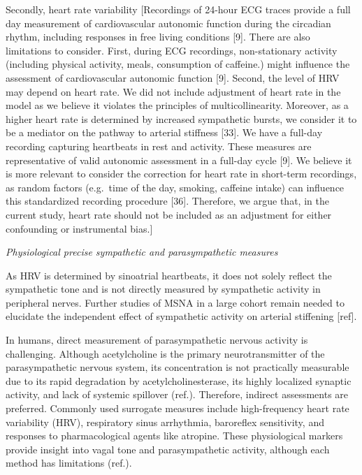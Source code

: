 \documentclass[
  a4paper,
  headsepline=true,
  open=any]{scrbook}
\begin{document}
Secondly, heart rate variability {[}Recordings of 24-hour ECG traces
provide a full day measurement of cardiovascular autonomic function
during the circadian rhythm, including responses in free living
conditions {[}9{]}. There are also limitations to consider. First,
during ECG recordings, non-stationary activity (including physical
activity, meals, consumption of caffeine.) might influence the
assessment of cardiovascular autonomic function {[}9{]}. Second, the
level of HRV may depend on heart rate. We did not include adjustment of
heart rate in the model as we believe it violates the principles of
multicollinearity. Moreover, as a higher heart rate is determined by
increased sympathetic bursts, we consider it to be a mediator on the
pathway to arterial stiffness {[}33{]}. We have a full-day recording
capturing heartbeats in rest and activity. These measures are
representative of valid autonomic assessment in a full-day cycle
{[}9{]}. We believe it is more relevant to consider the correction for
heart rate in short-term recordings, as random factors (e.g.~time of the
day, smoking, caffeine intake) can influence this standardized recording
procedure {[}36{]}. Therefore, we argue that, in the current study,
heart rate should not be included as an adjustment for either
confounding or instrumental bias.{]}

\emph{Physiological precise sympathetic and parasympathetic measures}

As HRV is determined by sinoatrial heartbeats, it does not solely
reflect the sympathetic tone and is not directly measured by sympathetic
activity in peripheral nerves. Further studies of MSNA in a large cohort
remain needed to elucidate the independent effect of sympathetic
activity on arterial stiffening {[}ref{]}.

In humans, direct measurement of parasympathetic nervous activity is
challenging. Although acetylcholine is the primary neurotransmitter of
the parasympathetic nervous system, its concentration is not practically
measurable due to its rapid degradation by acetylcholinesterase, its
highly localized synaptic activity, and lack of systemic spillover
(ref.). Therefore, indirect assessments are preferred. Commonly used
surrogate measures include high-frequency heart rate variability (HRV),
respiratory sinus arrhythmia, baroreflex sensitivity, and responses to
pharmacological agents like atropine. These physiological markers
provide insight into vagal tone and parasympathetic activity, although
each method has limitations (ref.).
\end{document}
